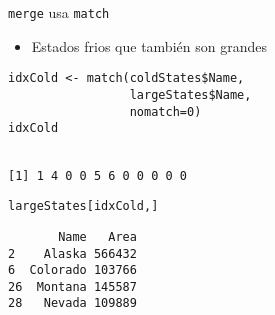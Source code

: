 \documentclass[xcolor={usenames,svgnames,dvipsnames}]{beamer}
\begin{document}
\begin{frame}[label={sec:org86a6294},fragile]{\texttt{merge} usa \texttt{match}}
 \begin{itemize}
\item Estados frios que también son grandes
\end{itemize}
\lstset{language=r,label= ,caption= ,captionpos=b,numbers=none}
\begin{lstlisting}
idxCold <- match(coldStates$Name,
                 largeStates$Name,
                 nomatch=0)
idxCold
\end{lstlisting}

\begin{verbatim}

[1] 1 4 0 0 5 6 0 0 0 0 0
\end{verbatim}


\lstset{language=r,label= ,caption= ,captionpos=b,numbers=none}
\begin{lstlisting}
largeStates[idxCold,]
\end{lstlisting}

\begin{verbatim}
       Name   Area
2    Alaska 566432
6  Colorado 103766
26  Montana 145587
28   Nevada 109889
\end{verbatim}
\end{frame}
\end{document}

